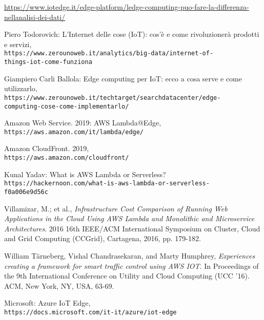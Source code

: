 \documentclass[a4paper,12pt,oneside]{book}
\begin{document}
\begin{thebibliography}{9}
	
	\url{https://www.iotedge.it/edge-platform/ledge-computing-puo-fare-la-differenza-nellanalisi-dei-dati/}
	
	
	
	
	
	
	
	
	Piero Todorovich: L’Internet delle cose (IoT): cos’è e come rivoluzionerà prodotti e servizi,
	\\\texttt{https://www.zerounoweb.it/analytics/big-data/internet-of-\\things-iot-come-funziona}
	
	Giampiero Carli Ballola: Edge computing per IoT: ecco a cosa serve e come utilizzarlo,
	\\\texttt{https://www.zerounoweb.it/techtarget/searchdatacenter/edge-\\computing-cose-come-implementarlo/}
		
	Amazon Web Service. 2019: AWS Lambda@Edge,
	\\\texttt{https://aws.amazon.com/it/lambda/edge/}
	
	Amazon CloudFront. 2019,
	\\\texttt{https://aws.amazon.com/cloudfront/}
	
	Kunal Yadav: What is AWS Lambda or Serverless?
	\\\texttt{https://hackernoon.com/what-is-aws-lambda-or-serverless-\\f0a006e9d56c}

	
	Villamizar, M.; et al., 
	\textit{Infrastructure Cost Comparison of Running Web Applications in the Cloud Using AWS Lambda and Monolithic and Microservice Architectures}. 
	2016 16th IEEE/ACM International Symposium on Cluster, Cloud and Grid Computing (CCGrid), Cartagena, 2016, pp. 179-182.
	
	William Tärneberg, Vishal Chandrasekaran, and Marty Humphrey, 
	\textit{Experiences creating a framework for smart traffic control using AWS IOT}. 
	In Proceedings of the 9th International Conference on Utility and Cloud Computing (UCC '16). ACM, New York, NY, USA, 63-69.
	
	Microsoft: Azure IoT Edge,
	\\\texttt{https://docs.microsoft.com/it-it/azure/iot-edge}
	

\end{thebibliography}
\end{document}
